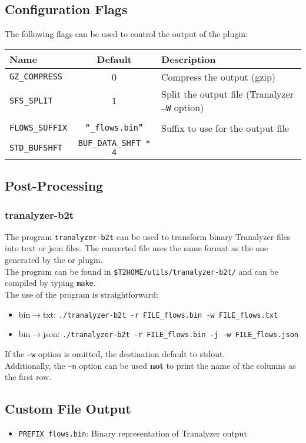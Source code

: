 \documentclass[documentation]{subfiles}
\begin{document}
\subsection{Configuration Flags}

The following flags can be used to control the output of the plugin:

\begin{longtable}{lcl}
    \toprule
    {\bf Name} & {\bf Default} & {\bf Description} \\
    \midrule\endhead%
    {\tt GZ\_COMPRESS} & 0 & Compress the output (gzip)\\
    {\tt SFS\_SPLIT} & 1 & Split the output file (Tranalyzer {\tt --W} option)\\\\
    {\tt FLOWS\_SUFFIX} & {\tt ``\_flows.bin''} & Suffix to use for the output file\\
    {\tt STD\_BUFSHFT} & {\tt BUF\_DATA\_SHFT * 4} & \\
    \bottomrule
\end{longtable}

\subsection{Post-Processing}

\subsubsection{tranalyzer-b2t}
The program {\tt tranalyzer-b2t} can be used to transform binary Tranalyzer files into text or json files.
The converted file uses the same format as the one generated by the  or  plugin.\\

The program can be found in {\tt\$T2HOME/utils/tranalyzer-b2t/} and can be compiled by typing {\tt make}.\\

The use of the program is straightforward:
\begin{itemize}
    \item bin$\rightarrow$txt: {\tt ./tranalyzer-b2t -r FILE\_flows.bin -w FILE\_flows.txt}\\
    \item bin$\rightarrow$json: {\tt ./tranalyzer-b2t -r FILE\_flows.bin -j -w FILE\_flows.json}\\
\end{itemize}

If the {\tt --w} option is omitted, the destination default to stdout.\\
Additionally, the {\tt --n} option can be used {\bf not} to print the name of the columns as the first row.

\subsection{Custom File Output}
\begin{itemize}
    \item {\tt PREFIX\_flows.bin}: Binary representation of Tranalyzer output
\end{itemize}
\end{document}
